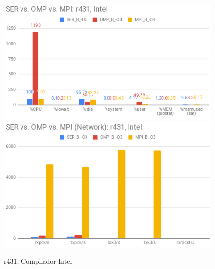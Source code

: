 \documentclass{article}
\begin{document}
\begin{appendices}
\begin{figure}[H]
    \centering
    \includegraphics[width=12cm]{Pictures/LUMZ_SER_OMP_MPI_r431_Intel_Comp.png}
    \includegraphics[width=12cm]{Pictures/LUMZ_SER_OMP_MPI_r431_Intel_Comm.png}
    \caption{r431: Compilador Intel}
    \label{fig:lumz_ser_omp_mpi_r431_intel}
\end{figure}


\end{appendices}
\end{document}

